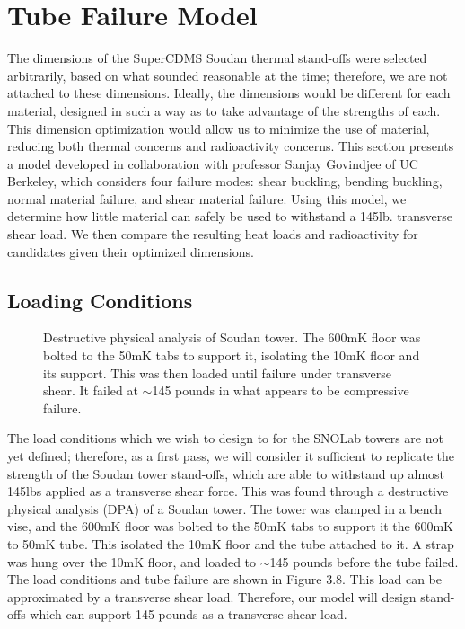 \documentclass{report}
\begin{document}
\section{Tube Failure Model}

The dimensions of the SuperCDMS Soudan thermal stand-offs were selected arbitrarily, based on what sounded reasonable at the time; therefore, we are not attached to these dimensions. Ideally, the dimensions would be different for each material, designed in such a way as to take advantage of the strengths of each. This dimension optimization would allow us to minimize the use of material, reducing both thermal concerns and radioactivity concerns. This section presents a model developed in collaboration with professor Sanjay Govindjee of UC Berkeley, which considers four failure modes: shear buckling, bending buckling, normal material failure, and shear material failure. Using this model, we determine how little material can safely be used to withstand a 145lb. transverse shear load. We then compare the resulting heat loads and radioactivity for candidates given their optimized dimensions.

\subsection{Loading Conditions}

\begin{figure}[ht]
\centering
{}
\qquad
{}
\caption{Destructive physical analysis of Soudan tower. The 600mK floor was bolted to the 50mK tabs to support it, isolating the 10mK floor and its support. This was then loaded until failure under transverse shear. It failed at $\sim$145 pounds in what appears to be compressive failure.}
\end{figure}

The load conditions which we wish to design to for the SNOLab towers are not yet defined; therefore, as a first pass, we will consider it sufficient to replicate the strength of the Soudan tower stand-offs, which are able to withstand up almost 145lbs applied as a transverse shear force. This was found through a destructive physical analysis (DPA) of a Soudan tower. The tower was clamped in a bench vise, and the 600mK floor was bolted to the 50mK tabs to support it the 600mK to 50mK tube. This isolated the 10mK floor and the tube attached to it. A strap was hung over the 10mK floor, and loaded to $\sim$145 pounds before the tube failed. The load conditions and tube failure are shown in Figure 3.8. This load can be approximated by a transverse shear load. Therefore, our model will design stand-offs which can support 145 pounds as a transverse shear load.
\end{document}
